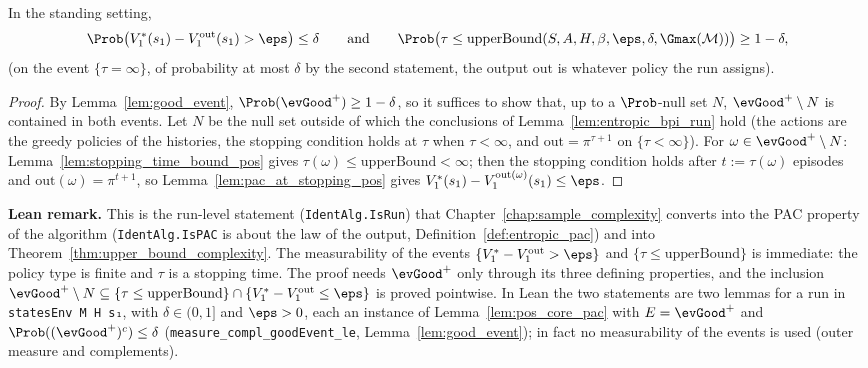 \begin{lemma}\label{lem:pac_pos}
\leanok
{}
In the standing setting,
\[
  \Prob\big(V^*_1(s_1) - V^{\mathrm{out}}_1(s_1) > \eps\big) \le \delta
  \qquad\text{and}\qquad
  \Prob\big(\tau \le \mathrm{upperBound}(S,A,H,\beta,\eps,\delta,\Gmax(\mathcal M))\big) \ge 1 - \delta ,
\]
(on the event $\{\tau = \infty\}$, of probability at most $\delta$ by the second statement, the
output $\mathrm{out}$ is whatever policy the run assigns).
\end{lemma}

\begin{proof}
\leanok
By Lemma~\ref{lem:good_event}, $\Prob(\evGood^+) \ge 1 - \delta$, so it suffices to show that, up to a
$\Prob$-null set $N$, $\evGood^+ \setminus N$ is contained in both events. Let $N$ be the null set
outside of which the conclusions of Lemma~\ref{lem:entropic_bpi_run} hold (the actions are the
greedy policies of the histories, the stopping condition holds at $\tau$ when $\tau < \infty$, and
$\mathrm{out} = \pi^{\tau + 1}$ on $\{\tau < \infty\}$). For $\omega \in \evGood^+ \setminus N$:
Lemma~\ref{lem:stopping_time_bound_pos} gives $\tau(\omega) \le \mathrm{upperBound} < \infty$; then the
stopping condition holds after $t := \tau(\omega)$ episodes and $\mathrm{out}(\omega) = \pi^{t+1}$, so
Lemma~\ref{lem:pac_at_stopping_pos} gives $V^*_1(s_1) - V^{\mathrm{out}(\omega)}_1(s_1) \le \eps$.
\end{proof}

\textbf{Lean remark.} This is the run-level statement (\texttt{IdentAlg.IsRun}) that
Chapter~\ref{chap:sample_complexity} converts into the PAC property of the algorithm
(\texttt{IdentAlg.IsPAC} is about the law of the output, Definition~\ref{def:entropic_pac}) and into
Theorem~\ref{thm:upper_bound_complexity}. The measurability of the events $\{V^*_1 - V^{\mathrm{out}}_1 > \eps\}$
and $\{\tau \le \mathrm{upperBound}\}$ is immediate: the policy type is finite and $\tau$ is a stopping time.
The proof needs $\evGood^+$ only through its three defining properties, and the inclusion
$\evGood^+ \setminus N \subseteq \{\tau \le \mathrm{upperBound}\} \cap \{V^*_1 - V^{\mathrm{out}}_1 \le \eps\}$ is proved
pointwise. In Lean the two statements are two lemmas for a run in \texttt{statesEnv M H s₁}, with $\delta \in (0, 1]$
and $\eps > 0$, each an instance of Lemma~\ref{lem:pos_core_pac} with $E = \evGood^+$ and
$\Prob((\evGood^+)^c) \le \delta$ (\texttt{measure\_compl\_goodEvent\_le}, Lemma~\ref{lem:good_event}); in fact no
measurability of the events is used (outer measure and complements).
